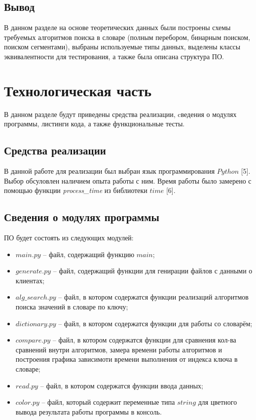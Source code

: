 \documentclass[a4paper,14pt, unknownkeysallowed]{extreport}
\begin{document}
\section{Вывод}

В данном разделе на основе теоретических данных были построены схемы требуемых алгоритмов поиска в словаре (полным перебором, бинарным поиском, поиском сегментами), выбраны используемые типы данных, выделены классы эквивалентности для тестирования, а также была описана структура ПО.

\clearpage





\chapter{Технологическая часть}

В данном разделе будут приведены средства реализации, cведения о модулях программы, листинги кода, а также функциональные тесты.


\section{Средства реализации}

В данной работе для реализации был выбран язык программирования $Python$ [5]. Выбор обсуловлен наличием опыта работы с ним. Время работы было замерено с помощью функции \textit{process\_time} из библиотеки $time$ [6].

\section{Сведения о модулях программы}

ПО будет состоять из следующих модулей:

\begin{itemize}
	\item $main.py$ -- файл, содержащий функцию $main$;
	\item $generate.py$ -- файл, содержащий функции для генирации файлов с данными о клиентах;
    \item $alg\_search.py$ -- файл, в котором содержатся функции реализаций алгоритмов поиска значений в словаре по ключу;
    \item $dictionary.py$ -- файл, в котором содержатся функции для работы со словарём;
    \item $compare.py$ -- файл, в котором содержатся функции для сравнения кол-ва сравнений внутри алгоритмов, замера времени работы алгоритмов и построения графика зависимоти времени выполнения от индекса ключа в словаре;
    \item $read.py$ -- файл, в котором содержатся функции ввода данных;
    \item $color.py$ -- файл, который содержит переменные типа $string$ для цветного вывода результата работы программы в консоль.
\end{itemize}
\end{document}
